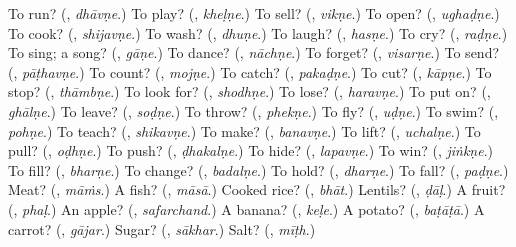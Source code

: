 \begin{tcolorbox}[breakable,colback=teal!4,colframe=teal!35!black,title={Before you move on}]
To run? (\textbf{}, \emph{dhāvṇe}.) To play? (\textbf{}, \emph{kheḷṇe}.) To sell? (\textbf{}, \emph{vikṇe}.) To open? (\textbf{}, \emph{ughaḍṇe}.) To cook? (\textbf{}, \emph{shijavṇe}.) To wash? (\textbf{}, \emph{dhuṇe}.) To laugh? (\textbf{}, \emph{hasṇe}.) To cry? (\textbf{}, \emph{raḍṇe}.) To sing; a song? (\textbf{}, \emph{gāṇe}.) To dance? (\textbf{}, \emph{nāchṇe}.) To forget? (\textbf{}, \emph{visarṇe}.) To send? (\textbf{}, \emph{pāṭhavṇe}.) To count? (\textbf{}, \emph{mojṇe}.) To catch? (\textbf{}, \emph{pakaḍṇe}.) To cut? (\textbf{}, \emph{kāpṇe}.) To stop? (\textbf{}, \emph{thāmbṇe}.) To look for? (\textbf{}, \emph{shodhṇe}.) To lose? (\textbf{}, \emph{haravṇe}.) To put on? (\textbf{}, \emph{ghālṇe}.) To leave? (\textbf{}, \emph{soḍṇe}.) To throw? (\textbf{}, \emph{phekṇe}.) To fly? (\textbf{}, \emph{uḍṇe}.) To swim? (\textbf{}, \emph{pohṇe}.) To teach? (\textbf{}, \emph{shikavṇe}.) To make? (\textbf{}, \emph{banavṇe}.) To lift? (\textbf{}, \emph{uchalṇe}.) To pull? (\textbf{}, \emph{oḍhṇe}.) To push? (\textbf{}, \emph{ḍhakalṇe}.) To hide? (\textbf{}, \emph{lapavṇe}.) To win? (\textbf{}, \emph{jiṅkṇe}.) To fill? (\textbf{}, \emph{bharṇe}.) To change? (\textbf{}, \emph{badalṇe}.) To hold? (\textbf{}, \emph{dharṇe}.) To fall? (\textbf{}, \emph{paḍṇe}.) Meat? (\textbf{}, \emph{māṁs}.) A fish? (\textbf{}, \emph{māsā}.) Cooked rice? (\textbf{}, \emph{bhāt}.) Lentils? (\textbf{}, \emph{ḍāḷ}.) A fruit? (\textbf{}, \emph{phaḷ}.) An apple? (\textbf{}, \emph{safarchand}.) A banana? (\textbf{}, \emph{keḷe}.) A potato? (\textbf{}, \emph{baṭāṭā}.) A carrot? (\textbf{}, \emph{gājar}.) Sugar? (\textbf{}, \emph{sākhar}.) Salt? (\textbf{}, \emph{mīṭh}.)
\end{tcolorbox}
